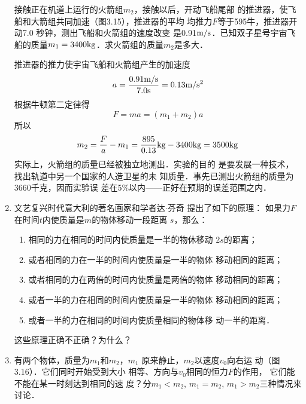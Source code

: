 \begin{enumerate}
接触正在机道上运行的火箭组$m_2$，接触以后，开动飞船尾部
的推进器，使飞船和大箭组共同加速（图3.15），推进器的平均
均推力$F$等于595牛，推进器开动7.0
秒钟，测出飞船和火箭组的速度改变
是0.91$\text{m}/\text{s}$．已知双子星号宇宙飞
船的质量$m_1=3400{\rm kg}$．求火箭组的质量$m_2$是多大．
\begin{figure}[htp]\centering
    \caption{}
    \end{figure}

\begin{solution}
    推进器的推力使宇宙飞船和火箭组产生的加速度
\[a=\frac{0.91\text{m}/\text{s}}{7.0{\rm s}}=0.13\text{m}/\text{s}^2 \]
根据牛顿第二定律得
\[F=ma=(m_1+m_2)a \]
所以
\[m_2=\frac{F}{a}-m_1=\frac{895}{0.13}{\rm kg}-3400{\rm kg}=3500{\rm kg} \]
实际上，火箭组的质量已经被独立地测出．实验的目的
是要发展一种技术，找出轨道中另一个国家的人造卫星的未
知质量．事先已测出火箭组的质量为3660千克，因而实验误
差在5\%以内——正好在预期的误差范围之内．
\end{solution}

\item    文艺复兴时代意大利的著名画家和学者达$\cdot$芬奇
提出了如下的原理：
    如果力$F$在时间$t$内使质量是$m$的物体移动一段距离
$s$，那么：
\begin{enumerate}
    \item  相同的力在相同的时间内使质量是一半的物休移动
    $2s$的距离；
\item  或者相同的力在一半的时间内使质量是一半的物体
移动相同的距离；
\item  或者相同的力在两倍的时间内使质量是两倍的物体
移动相同的距离；
\item  或者一半的力在相同的时间内使质量是一半的物体
移动相同的距离；
\item  或者一半的力在相同的时间内使质量相同的物体移
动一半的距离．
\end{enumerate}
    这些原理正确不正确？为什么？

\item   有两个物体，质量为$m_1$和$m_2$，$m_1$
原来静止，$m_2$以速度$v_0$向右运
动（图3.16）．它们同时开始受到大小
相等、方向与$v_0$相同的恒力$F$的作用，
它们能不能在某一时刻达到相同的速
度？分$m_1<m_2$, $m_1=m_2$, $m_1>m_2$三种情况来讨论．
\begin{figure}[htp]\centering
    \caption{}
    \end{figure}
\end{enumerate}





















